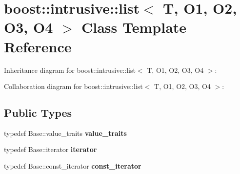 \hypertarget{classboost_1_1intrusive_1_1list}{}\section{boost\+:\+:intrusive\+:\+:list$<$ T, O1, O2, O3, O4 $>$ Class Template Reference}
\label{classboost_1_1intrusive_1_1list}


Inheritance diagram for boost\+:\+:intrusive\+:\+:list$<$ T, O1, O2, O3, O4 $>$\+:


Collaboration diagram for boost\+:\+:intrusive\+:\+:list$<$ T, O1, O2, O3, O4 $>$\+:
\subsection*{Public Types}
\begin{DoxyCompactItemize}
\item 
\mbox{\label{classboost_1_1intrusive_1_1list_aed9db2882c7567d4600fce5dda67c0ab}} 
typedef Base\+::value\+\_\+traits {\bfseries value\+\_\+traits}
\item 
\mbox{\label{classboost_1_1intrusive_1_1list_a3b53513ff4e214951fc767223097fb6e}} 
typedef Base\+::iterator {\bfseries iterator}
\item 
\mbox{\label{classboost_1_1intrusive_1_1list_a4a837c7b342e3461c2a8ed48df5dd9a3}} 
typedef Base\+::const\+\_\+iterator {\bfseries const\+\_\+iterator}
\end{DoxyCompactItemize}
